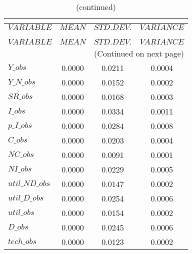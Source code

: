  
\begin{center}
\begin{longtable}{lccc} 
\caption{THEORETICAL MOMENTS}\\
 \label{Table:th_moments}\\
\toprule 
$VARIABLE       $	 & 	 $         MEAN$	 & 	 $    STD. DEV.$	 & 	 $     VARIANCE$\\
\midrule \endfirsthead 
\caption{(continued)}\\
 \toprule \\ 
$VARIABLE       $	 & 	 $         MEAN$	 & 	 $    STD. DEV.$	 & 	 $     VARIANCE$\\
\midrule \endhead 
\midrule \multicolumn{4}{r}{(Continued on next page)} \\ \bottomrule \endfoot 
\bottomrule \endlastfoot 
$Y\_obs         $	 & 	       0.0000	 & 	       0.0211	 & 	       0.0004 \\ 
$Y\_N\_obs      $	 & 	       0.0000	 & 	       0.0152	 & 	       0.0002 \\ 
$SR\_obs        $	 & 	       0.0000	 & 	       0.0168	 & 	       0.0003 \\ 
$I\_obs         $	 & 	       0.0000	 & 	       0.0334	 & 	       0.0011 \\ 
$p\_I\_obs      $	 & 	       0.0000	 & 	       0.0284	 & 	       0.0008 \\ 
$C\_obs         $	 & 	       0.0000	 & 	       0.0203	 & 	       0.0004 \\ 
$NC\_obs        $	 & 	       0.0000	 & 	       0.0091	 & 	       0.0001 \\ 
$NI\_obs        $	 & 	       0.0000	 & 	       0.0229	 & 	       0.0005 \\ 
$util\_ND\_obs  $	 & 	       0.0000	 & 	       0.0147	 & 	       0.0002 \\ 
$util\_D\_obs   $	 & 	       0.0000	 & 	       0.0254	 & 	       0.0006 \\ 
$util\_obs      $	 & 	       0.0000	 & 	       0.0154	 & 	       0.0002 \\ 
$D\_obs         $	 & 	       0.0000	 & 	       0.0245	 & 	       0.0006 \\ 
$tech\_obs      $	 & 	       0.0000	 & 	       0.0123	 & 	       0.0002 \\ 
\end{longtable}
 \end{center}
